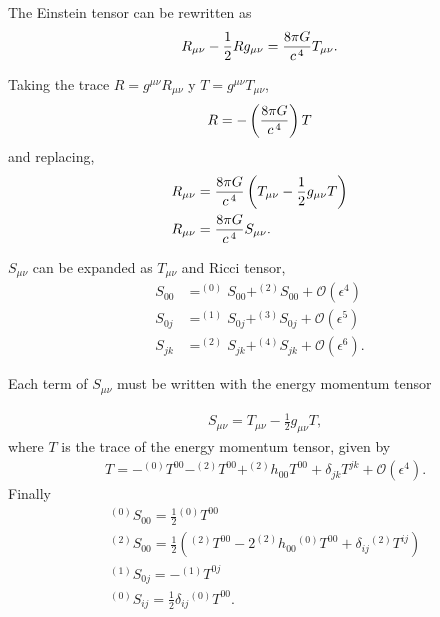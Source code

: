 The Einstein tensor can be rewritten as
\begin{align}
R_{\mu\nu} -\frac{1}{2}Rg_{\mu\nu}= \frac{8\pi G}{c^{\hspace{0.05cm}4}}T_{\mu\nu}.
\end{align}

Taking the trace $R = g^{\mu\nu}R_{\mu\nu}$ y $T = g^{\mu\nu}T_{\mu\nu}$,
\begin{align}
R = -\left(\frac{8\pi G}{c^{\hspace{0.05cm}4}}\right)T
\end{align}
and replacing,
\begin{align}
R_{\mu\nu} &= \frac{8\pi G}{c^{\hspace{0.05cm}4}}\left(T_{\mu\nu}-\frac{1}{2}g_{\mu\nu}T\right)\\
R_{\mu\nu} &= \frac{8\pi G}{c^{\hspace{0.05cm}4}}S_{\mu\nu}.
\end{align}

$S_{\mu\nu}$ can be expanded as $T_{\mu\nu}$ and Ricci tensor,
\begin{subequations}
	\begin{align}
S_{00} &= ^{(0)}S_{00}+^{(2)}S_{00}+\mathcal{O}(\epsilon^4)\\
S_{0j} &= ^{(1)}S_{0j}+^{(3)}S_{0j}+\mathcal{O}(\epsilon^5)\\
S_{jk} &= ^{(2)}S_{jk}+^{(4)}S_{jk}+\mathcal{O}(\epsilon^6).
\end{align}
\end{subequations}

Each term of $S_{\mu\nu}$ must be written with the energy momentum tensor

\begin{align}
\label{eq: Smntensor}
&S_{\mu\nu}=T_{\mu\nu}-\frac{1}{2}g_{\mu\nu}T,
\end{align}
where $T$ is the trace of the energy momentum tensor, given by
\begin{align}
&T= -^{(0)}T^{00} - ^{(2)}T^{00}+^{(2)}h_{00}T^{00}+\delta_{jk}T^{jk}+\mathcal{O}(\epsilon^4).
\end{align}
Finally
\begin{subequations}
\begin{align}
\label{eq: SintermsofT}
&^{(0)}S_{00} = \frac{1}{2}{}^{(0)}T^{00}\\
&^{(2)}S_{00}= \frac{1}{2}\left(^{(2)}T^{00}-2^{(2)}h_{00}{}^{(0)}T^{00}+\delta_{ij}{}^{(2)}T^{ij}\right)\\
&^{(1)}S_{0j}= -{}^{(1)}T^{0j}\\
&^{(0)}S_{ij}= \frac{1}{2}\delta_{ij}{}^{(0)}T^{00}.
\end{align}
\end{subequations}


